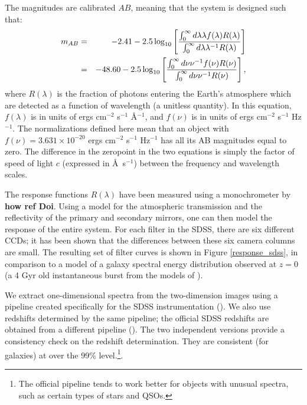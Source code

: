 \documentclass[10pt,preprint]{aastex}
\begin{document}
The magnitudes are calibrated $AB$, meaning that the system is
designed such that:
\begin{eqnarray}
m_{AB} &=& -2.41 - 2.5 \log_{10}\left[
\frac{\int_{0}^{\infty} d\lambda \lambda f(\lambda) R(\lambda)}
{\int_{0}^{\infty} d\lambda \lambda^{-1} R(\lambda)}\right]
\cr
&=& -48.60 - 2.5 \log_{10}\left[
\frac{\int_{0}^{\infty} d\nu \nu^{-1} f(\nu) R(\nu)}
{\int_{0}^{\infty} d\nu \nu^{-1} R(\nu)}\right],
\end{eqnarray}
where $R(\lambda)$ is the fraction of photons entering the Earth's
atmosphere which are detected as a function of wavelength (a unitless
quantity). In this equation, $f(\lambda)$ is in units of ergs
cm$^{-2}$ s$^{-1}$ \AA$^{-1}$, and $f(\nu)$ is in units of ergs
cm$^{-2}$ s$^{-1}$ Hz$^{-1}$. The normalizations defined here mean
that an object with $f(\nu) = 3.631 \times 10^{-20}$ ergs cm$^{-2}$
s$^{-1}$ Hz$^{-1}$ has all its AB magnitudes equal to zero.  The
difference in the zeropoint in the two equations is simply the factor
of speed of light $c$ (expressed in \AA\ s$^{-1}$) between the
frequency and wavelength scales.

The response functions $R(\lambda)$ have been measured using a
monochrometer by {\bf how ref Doi}.  Using a model for the atmospheric
transmission and the reflectivity of the primary and secondary
mirrors, one can then model the response of the entire system. For
each filter in the SDSS, there are six different CCDs; it has been
shown that the differences between these six camera columns are
small. The resulting set of filter curves is shown in Figure
\ref{response_sdss}, in comparison to a model of a galaxy spectral
energy distribution observed at $z=0$ (a 4 Gyr old instantaneous burst
from the models of \citealt{bruzual93a}).

We extract one-dimensional spectra from the two-dimension images using
a pipeline created specifically for the SDSS instrumentation
(\citealt{schlegel02a}). We also use redshifts determined by the same
pipeline; the official SDSS redshifts are obtained from a different
pipeline (\citealt{subbarao02a}). The two independent versions provide
a consistency check on the redshift determination. They are consistent
(for galaxies) at over the 99\% level.\footnote{The official pipeline
tends to work better for objects with unusual spectra, such as certain
types of stars and QSOs.}.
\end{document}
